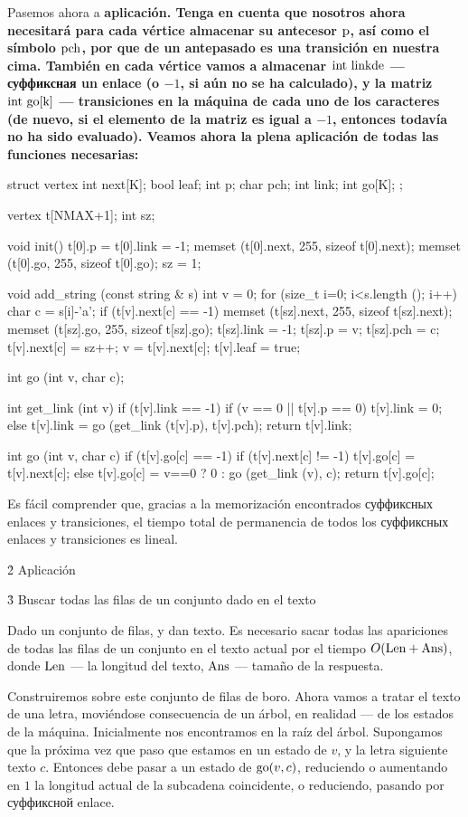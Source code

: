Pasemos ahora a \bf{aplicación}. Tenga en cuenta que nosotros ahora necesitará para cada vértice almacenar su antecesor $\rm p$, así como el símbolo $\rm pch$, por que de un antepasado es una transición en nuestra cima. También en cada vértice vamos a almacenar $\rm int~link de$ --- суффиксная un enlace (o $-1$, si aún no se ha calculado), y la matriz $\rm int~go[k]$ --- transiciones en la máquina de cada uno de los caracteres (de nuevo, si el elemento de la matriz es igual a $-1$, entonces todavía no ha sido evaluado). Veamos ahora la plena aplicación de todas las funciones necesarias:

\code
struct vertex {
int next[K];
bool leaf;
int p;
char pch;
int link;
int go[K];
};

vertex t[NMAX+1];
int sz;

void init() {
t[0].p = t[0].link = -1;
memset (t[0].next, 255, sizeof t[0].next);
memset (t[0].go, 255, sizeof t[0].go);
sz = 1;
}

void add_string (const string & s) {
int v = 0;
for (size_t i=0; i<s.length (); i++) {
char c = s[i]-'a';
if (t[v].next[c] == -1) {
memset (t[sz].next, 255, sizeof t[sz].next);
memset (t[sz].go, 255, sizeof t[sz].go);
t[sz].link = -1;
t[sz].p = v;
t[sz].pch = c;
t[v].next[c] = sz++;
}
v = t[v].next[c];
}
t[v].leaf = true;
}

int go (int v, char c);

int get_link (int v) {
if (t[v].link == -1)
if (v == 0 || t[v].p == 0)
t[v].link = 0;
else
t[v].link = go (get_link (t[v].p), t[v].pch);
return t[v].link;
}

int go (int v, char c) {
if (t[v].go[c] == -1)
if (t[v].next[c] != -1)
t[v].go[c] = t[v].next[c];
else
t[v].go[c] = v==0 ? 0 : go (get_link (v), c);
return t[v].go[c];
}
\endcode

Es fácil comprender que, gracias a la memorización encontrados суффиксных enlaces y transiciones, el tiempo total de permanencia de todos los суффиксных enlaces y transiciones es lineal.


\h2{ Aplicación }

\h3{ Buscar todas las filas de un conjunto dado en el texto }

Dado un conjunto de filas, y dan texto. Es necesario sacar todas las apariciones de todas las filas de un conjunto en el texto actual por el tiempo $O ({\rm Len + Ans})$, donde $\rm Len$ --- la longitud del texto, $\rm Ans$ --- tamaño de la respuesta.

Construiremos sobre este conjunto de filas de boro. Ahora vamos a tratar el texto de una letra, moviéndose consecuencia de un árbol, en realidad --- de los estados de la máquina. Inicialmente nos encontramos en la raíz del árbol. Supongamos que la próxima vez que paso que estamos en un estado de $v$, y la letra siguiente texto $c$. Entonces debe pasar a un estado de ${\rm go} (v, c)$, reduciendo o aumentando en $1$ la longitud actual de la subcadena coincidente, o reduciendo, pasando por суффиксной enlace.

